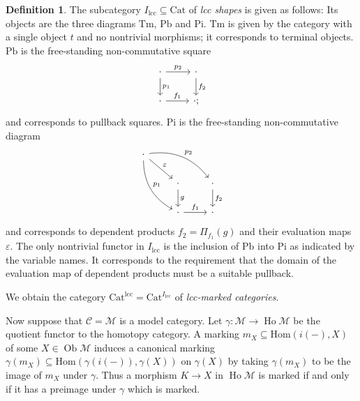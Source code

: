 \documentclass[a4paper]{article}
\theoremstyle{remark}
\theoremstyle{definition}
\newtheorem{definition}[theorem]{Definition}
\begin{document}
\begin{definition}
  The subcategory $I_\mathrm{lcc} \subseteq \mathrm{Cat}$ of \emph{lcc shapes} is given as follows:
  Its objects are the three diagrams $\mathrm{Tm}$, $\mathrm{Pb}$ and $\mathrm{Pi}$.
  $\mathrm{Tm}$ is given by the category with a single object $t$ and no nontrivial morphisms; it corresponds to terminal objects.
  $\mathrm{Pb}$ is the free-standing non-commutative square
  \begin{equation}
    \begin{tikzcd}
      \cdot \arrow[d, "p_1"] \arrow[r, "p_2"] & \cdot \arrow[d, "f_2"] \\
      \cdot \arrow[r, "f_1"] & \cdot;
    \end{tikzcd}
  \end{equation}
  and corresponds to pullback squares.
  $\mathrm{Pi}$ is the free-standing non-commutative diagram
  \begin{equation}
    \begin{tikzcd}
      \cdot \arrow[ddr, bend right, "p_1"] \arrow[drr, bend left, "p_2"] \arrow[dr, "\varepsilon"] \\
      & \cdot \arrow[d, "g"] & \cdot \arrow[d, "f_2"] \\
      & \cdot \arrow[r, "f_1"] & \cdot
    \end{tikzcd}
  \end{equation}
  and corresponds to dependent products $f_2 = \Pi_{f_1}(g)$ and their evaluation maps $\varepsilon$.
  The only nontrivial functor in $I_\mathrm{lcc}$ is the inclusion of $\mathrm{Pb}$ into $\mathrm{Pi}$ as indicated by the variable names.
  It corresponds to the requirement that the domain of the evaluation map of dependent products must be a suitable pullback.

  We obtain the category $\mathrm{Cat}^\mathrm{lcc} = \mathrm{Cat}^{I_\mathrm{lcc}}$ of \emph{lcc-marked categories}.
\end{definition}

Now suppose that $\mathcal{C} = \mathcal{M}$ is a model category.
Let $\gamma : \mathcal{M} \rightarrow \operatorname{Ho} \mathcal{M}$ be the quotient functor to the homotopy category.
A marking $m_X \subseteq \mathrm{Hom}(i(-), X)$ of some $X \in \operatorname{Ob} \mathcal{M}$ induces a canonical marking $\gamma(m_X) \subseteq \mathrm{Hom}(\gamma(i(-)), \gamma(X))$ on $\gamma(X)$ by taking $\gamma(m_X)$ to be the image of $m_X$ under $\gamma$.
Thus a morphism $K \rightarrow X$ in $\operatorname{Ho} \mathcal{M}$ is marked if and only if it has a preimage under $\gamma$ which is marked.
\end{document}

